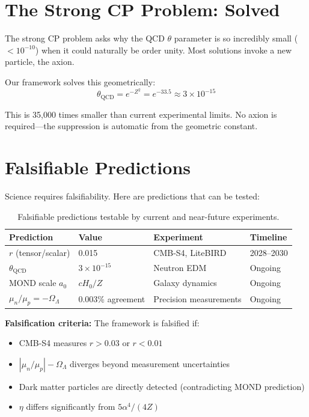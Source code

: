 \documentclass[11pt,a4paper]{article}
\theoremstyle{plain}
\theoremstyle{definition}
\theoremstyle{remark}
\newcommand{\OmegaL}{\Omega_\Lambda}
\begin{document}
\section{The Strong CP Problem: Solved}

The strong CP problem asks why the QCD $\theta$ parameter is so incredibly small ($<10^{-10}$) when it could naturally be order unity. Most solutions invoke a new particle, the axion.

Our framework solves this geometrically:
\[
\theta_{\text{QCD}} = e^{-Z^2} = e^{-33.5} \approx 3 \times 10^{-15}
\]

This is 35,000 times smaller than current experimental limits. No axion is required---the suppression is automatic from the geometric constant.

\section{Falsifiable Predictions}

Science requires falsifiability. Here are predictions that can be tested:

\begin{table}[h!]
\centering
\begin{tabular}{llll}
\toprule
\textbf{Prediction} & \textbf{Value} & \textbf{Experiment} & \textbf{Timeline} \\
\midrule
$r$ (tensor/scalar) & 0.015 & CMB-S4, LiteBIRD & 2028--2030 \\
$\theta_{\text{QCD}}$ & $3 \times 10^{-15}$ & Neutron EDM & Ongoing \\
MOND scale $a_0$ & $cH_0/Z$ & Galaxy dynamics & Ongoing \\
$\mu_n/\mu_p = -\OmegaL$ & 0.003\% agreement & Precision measurements & Ongoing \\
\bottomrule
\end{tabular}
\caption{Falsifiable predictions testable by current and near-future experiments.}
\end{table}

\textbf{Falsification criteria:} The framework is falsified if:
\begin{itemize}
  \item CMB-S4 measures $r > 0.03$ or $r < 0.01$
  \item $|\mu_n/\mu_p| - \OmegaL$ diverges beyond measurement uncertainties
  \item Dark matter particles are directly detected (contradicting MOND prediction)
  \item $\eta$ differs significantly from $5\alpha^4/(4Z)$
\end{itemize}
\end{document}
